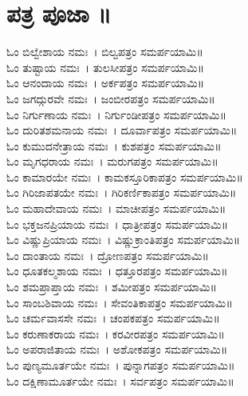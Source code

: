 \section{ಪತ್ರ ಪೂಜಾ ॥}
ಓಂ ಬಿಲ್ವೇಶಾಯ ನಮಃ~। ಬಿಲ್ವಪತ್ರಂ ಸಮರ್ಪಯಾಮಿ॥\\
ಓಂ ತುಷ್ಟಾಯ ನಮಃ~। ತುಲಸೀಪತ್ರಂ ಸಮರ್ಪಯಾಮಿ॥\\
ಓಂ ಆನಂದಾಯ ನಮಃ~। ಅರ್ಕಪತ್ರಂ ಸಮರ್ಪಯಾಮಿ॥\\
ಓಂ ಜಗದ್ಗುರವೇ ನಮಃ~। ಜಂಬೀರಪತ್ರಂ ಸಮರ್ಪಯಾಮಿ॥\\
ಓಂ ನಿರ್ಗುಣಾಯ ನಮಃ~। ನಿರ್ಗುಂಡೀಪತ್ರಂ ಸಮರ್ಪಯಾಮಿ॥\\
ಓಂ ದುರಿತಶಮನಾಯ ನಮಃ~। ದೂರ್ವಾಪತ್ರಂ ಸಮರ್ಪಯಾಮಿ॥\\
ಓಂ ಕುಮುದನೇತ್ರಾಯ ನಮಃ~। ಕುಶಪತ್ರಂ ಸಮರ್ಪಯಾಮಿ॥\\
ಓಂ ಮೃಗಧರಾಯ ನಮಃ~। ಮರುಗಪತ್ರಂ ಸಮರ್ಪಯಾಮಿ॥\\
ಓಂ ಕಾಮಾರಯೇ ನಮಃ~। ಕಾಮಕಸ್ತೂರಿಕಾಪತ್ರಂ ಸಮರ್ಪಯಾಮಿ॥\\
ಓಂ ಗಿರಿಜಾಪತಯೇ ನಮಃ~। ಗಿರಿಕರ್ಣಿಕಾಪತ್ರಂ ಸಮರ್ಪಯಾಮಿ॥\\
ಓಂ ಮಹಾದೇವಾಯ ನಮಃ~। ಮಾಚೀಪತ್ರಂ ಸಮರ್ಪಯಾಮಿ॥\\
ಓಂ ಭಕ್ತಜನಪ್ರಿಯಾಯ ನಮಃ~। ಧಾತ್ರೀಪತ್ರಂ ಸಮರ್ಪಯಾಮಿ॥\\
ಓಂ ವಿಷ್ಣುಪ್ರಿಯಾಯ ನಮಃ~। ವಿಷ್ಣುಕ್ರಾಂತಿಪತ್ರಂ ಸಮರ್ಪಯಾಮಿ॥\\
ಓಂ ದಾಂತಾಯ ನಮಃ~। ದ್ರೋಣಪತ್ರಂ ಸಮರ್ಪಯಾಮಿ॥\\
ಓಂ ಧೂತಕಲ್ಮಶಾಯ ನಮಃ~। ಧತ್ತೂರಪತ್ರಂ ಸಮರ್ಪಯಾಮಿ॥\\
ಓಂ ಶಮಪ್ರಾಪ್ತಾಯ ನಮಃ~। ಶಮೀಪತ್ರಂ ಸಮರ್ಪಯಾಮಿ॥\\
ಓಂ ಸಾಂಬಶಿವಾಯ ನಮಃ~। ಸೇವಂತಿಕಾಪತ್ರಂ ಸಮರ್ಪಯಾಮಿ॥\\
ಓಂ ಚರ್ಮವಾಸಸೇ ನಮಃ~। ಚಂಪಕಪತ್ರಂ ಸಮರ್ಪಯಾಮಿ॥\\
ಓಂ ಕರುಣಾಕರಾಯ ನಮಃ~। ಕರವೀರಪತ್ರಂ ಸಮರ್ಪಯಾಮಿ॥\\ 
ಓಂ ಅಪರಾಜಿತಾಯ ನಮಃ~। ಅಶೋಕಪತ್ರಂ ಸಮರ್ಪಯಾಮಿ॥\\
ಓಂ ಪುಣ್ಯಮೂರ್ತಯೇ ನಮಃ~। ಪುನ್ನಾಗಪತ್ರಂ ಸಮರ್ಪಯಾಮಿ॥\\
ಓಂ ದಕ್ಷಿಣಾಮೂರ್ತಯೇ ನಮಃ~। ಸರ್ವಪತ್ರಂ ಸಮರ್ಪಯಾಮಿ॥
